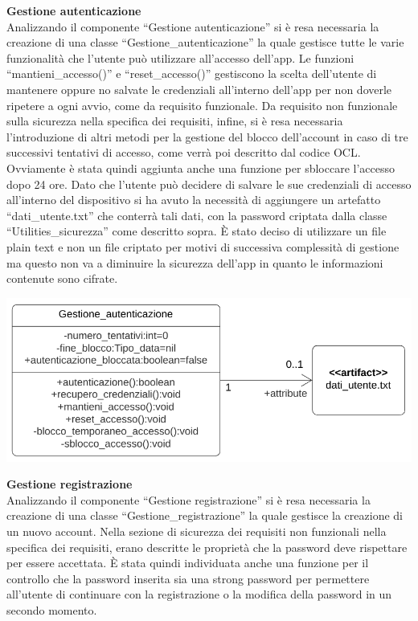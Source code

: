 \documentclass{article}
\begin{document}
      {\large\textbf{Gestione autenticazione}}\\

      Analizzando il componente “Gestione autenticazione” si è resa necessaria la creazione di una classe “Gestione\_autenticazione” la quale gestisce tutte le varie funzionalità che l’utente può utilizzare all’accesso dell’app. Le funzioni “mantieni\_accesso()” e “reset\_accesso()” gestiscono la scelta dell’utente di mantenere oppure no salvate le credenziali all’interno dell’app per non doverle ripetere a ogni avvio, come da requisito funzionale. Da requisito non funzionale sulla sicurezza nella specifica dei requisiti, infine, si è resa necessaria l’introduzione di altri metodi per la gestione del blocco dell’account in caso di tre successivi tentativi di accesso, come verrà poi descritto dal codice OCL. Ovviamente è stata quindi aggiunta anche una funzione per sbloccare l’accesso dopo 24 ore.
      Dato che l’utente può decidere di salvare le sue credenziali di accesso all’interno del dispositivo si ha avuto la necessità di aggiungere un artefatto “dati\_utente.txt” che conterrà tali dati, con la password criptata dalla classe “Utilities\_sicurezza” come descritto sopra. È  stato deciso di utilizzare un file plain text e non un file criptato per motivi di successiva complessità di gestione ma questo non va a diminuire la sicurezza dell’app in quanto le informazioni contenute sono cifrate.\\
      
      \begin{center}
            \includegraphics[scale=0.5]{classi/Gestione_autenticazione.png}
      \end{center}
      
      

      {\large\textbf{Gestione registrazione}}\\

      Analizzando il componente “Gestione registrazione” si è resa necessaria la creazione di una classe “Gestione\_registrazione” la quale gestisce la creazione di un nuovo account. Nella sezione di sicurezza dei requisiti non funzionali nella specifica dei requisiti, erano descritte le proprietà che la password deve rispettare per essere accettata. È stata quindi individuata anche una funzione per il controllo che la password inserita sia una strong password per permettere all’utente di continuare con la registrazione o la modifica della password in un secondo momento.\\
\end{document}
